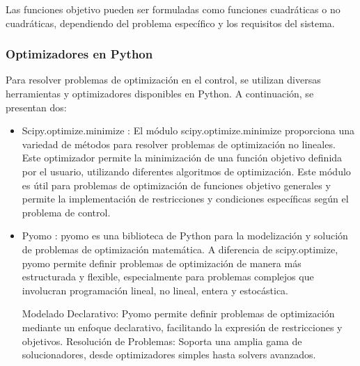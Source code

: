 Las funciones objetivo pueden ser formuladas como funciones cuadráticas o no cuadráticas, dependiendo del problema específico y los requisitos del sistema.

\subsubsection{Optimizadores en Python}

Para resolver problemas de optimización en el control, se utilizan diversas herramientas y optimizadores disponibles en Python. A continuación, se presentan dos:

\begin{itemize}
	\item Scipy.optimize.minimize \cite{ref31}: El módulo scipy.optimize.minimize proporciona una variedad de métodos para resolver problemas de optimización no lineales. Este optimizador permite la minimización de una función objetivo definida por el usuario, utilizando diferentes algoritmos de optimización. Este módulo es útil para problemas de optimización de funciones objetivo generales y permite la implementación de restricciones y condiciones específicas según el problema de control.
	
	\item Pyomo \cite{ref32,ref33}: pyomo es una biblioteca de Python para la modelización y solución de problemas de optimización matemática. A diferencia de scipy.optimize, pyomo permite definir problemas de optimización de manera más estructurada y flexible, especialmente para problemas complejos que involucran programación lineal, no lineal, entera y estocástica.
	
	Modelado Declarativo: Pyomo permite definir problemas de optimización mediante un enfoque declarativo, facilitando la expresión de restricciones y objetivos.
	Resolución de Problemas: Soporta una amplia gama de solucionadores, desde optimizadores simples hasta solvers avanzados.
	
	
\end{itemize}

